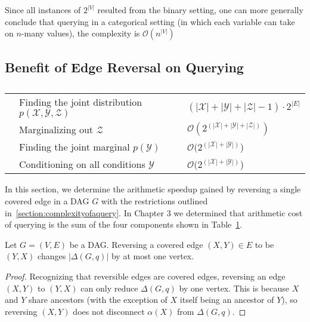 \begin{remark} Since all instances of $2^{|V|}$ resulted from the binary setting, one can more generally conclude that querying in a categorical setting (in which each variable can take on $n$-many values), the complexity is $\mathcal{O}(n^{|V|})$
\end{remark}

\newpage
\subsection{Benefit of Edge Reversal on Querying}

\begin{table}[h!]
  \begin{center}
    \begin{tabular}{l  l  l }
	&Finding the joint distribution $p(\mathcal{X},\mathcal{Y},\mathcal{Z})$ 	& $(|\mathcal{X}|+|\mathcal{Y}|+ |\mathcal{Z}|-1)\cdot 2^{|E|}$ \\[1em]
	&Marginalizing out $\mathcal{Z}$	 						& $\mathcal{O}(2^{(|\mathcal{X}| + |\mathcal{Y}| + |\mathcal{Z}|)})$ \\[1em]
	&Finding the joint marginal $p(\mathcal{Y})$ 					& $\mathcal{O}(2^{(|\mathcal{X}| + |\mathcal{Y}|)}$) \\[1em]
	&Conditioning on all conditions $\mathcal{Y}$					& $\mathcal{O}(2^{(|\mathcal{X}| + |\mathcal{Y}|)}$) \\[1em]
    \end{tabular}
  \end{center}
  \caption{}
   \label{tab:tableofcosts}
  \end{table}
  
\null \quad \quad In this section, we determine the arithmetic speedup gained by reversing a single covered edge in a DAG $G$ with the restrictions outlined in~\cref{section:complexityofaquery}. In Chapter $3$ we determined that arithmetic cost of querying is the sum of the four components shown in Table~\ref{tab:tableofcosts}.\newline

\begin{lemma}\label{lemma:onevertex}
Let $G=(V,E)$ be a DAG. Reversing a covered edge $(X,Y) \in E$ to be $(Y,X)$ changes $|\Delta(G,q)|$ by at most one vertex. 
\end{lemma}

\begin{proof}
Recognizing that reversible edges are covered edges, reversing an edge $(X,Y)$ to $(Y,X)$ can only reduce $\Delta(G,q)$ by one vertex. This is because $X$ and $Y$ share ancestors (with the exception of $X$ itself being an ancestor of $Y$), so reversing $(X,Y)$ does not disconnect $\alpha(X)$ from $\Delta(G,q)$. 
\end{proof}


